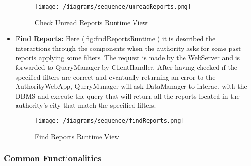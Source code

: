 \begin{itemize}
				\begin{figure}[h!]
					\centering
					\texttt{[image: /diagrams/sequence/unreadReports.png]}
					\caption{\label{fig:unreadReportsRuntime} Check Unread Reports Runtime View}
				\end{figure}
			
				\item \textbf{Find Reports:} Here (\autoref{fig:findReportsRuntime}) it is described the interactions through the components when the authority asks for some past reports applying some filters. The request is made by the WebServer and is forwarded to QueryManager by ClientHandler. After having checked if the specified filters are correct and eventually returning an error to the AuthorityWebApp, QueryManager will ask DataManager to interact with the DBMS and execute the query that will return all the reports located in the authority’s city that match the specified filters.
				
				\begin{figure}[h!]
					\centering
					\texttt{[image: /diagrams/sequence/findReports.png]}
					\caption{\label{fig:findReportsRuntime} Find Reports Runtime View}
				\end{figure}
			\end{itemize}
		
		\subsubsection[Common Functionalities]{\hyperlink{toc}{Common Functionalities}}
			\label{sec:commonFunctionalitiesRuntime}
			
